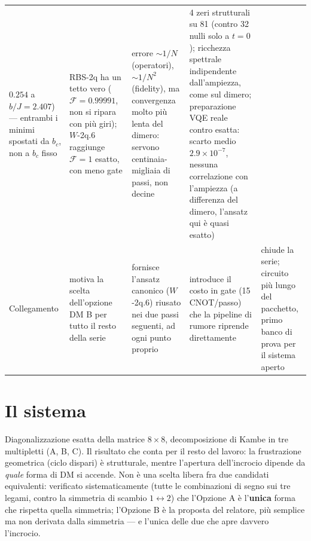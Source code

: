 \documentclass[11pt,a4paper]{article}
\begin{document}
\begin{landscape}
\begin{center}
\begin{tabular}{@{}>{\bfseries\raggedright}p{2.7cm} p{5.15cm} p{5.15cm} p{5.15cm} p{5.15cm}@{}}
$0.254$ a $b/J{=}2.407$) --- entrambi i minimi spostati da $b_c$, non a
$b_c$ fisso &
RBS-2q ha un tetto vero ($\mathcal F=0.99991$, non si ripara con più giri);
$W$-2q.6 raggiunge $\mathcal F=1$ esatto, con meno gate &
errore $\sim1/N$ (operatori), $\sim1/N^2$ (fidelity), ma convergenza molto
più lenta del dimero: servono centinaia-migliaia di passi, non decine &
4 zeri strutturali su 81 (contro 32 nulli solo a $t{=}0$); ricchezza
spettrale indipendente dall'ampiezza, come sul dimero; preparazione VQE
reale contro esatta: scarto medio $2.9\times10^{-7}$, nessuna correlazione
con l'ampiezza (a differenza del dimero, l'ansatz qui è quasi esatto) \\
\addlinespace
Collegamento &
motiva la scelta dell'opzione DM B per tutto il resto della serie &
fornisce l'ansatz canonico ($W$-2q.6) riusato nei due passi seguenti, ad
ogni punto proprio &
introduce il costo in gate (15 CNOT/passo) che la pipeline di rumore
riprende direttamente &
chiude la serie; circuito più lungo del pacchetto, primo banco di prova
per il sistema aperto \\
\bottomrule
\end{tabular}

\bigskip
{}
\end{center}
\end{landscape}

\clearpage

\section{Il sistema}

Diagonalizzazione esatta della matrice $8\times8$, decomposizione di Kambe
in tre multipletti (A, B, C). Il risultato che conta per il resto del
lavoro: la frustrazione geometrica (ciclo dispari) è strutturale, mentre
l'apertura dell'incrocio dipende da \emph{quale} forma di DM si accende.
Non è una scelta libera fra due candidati equivalenti: verificato
sistematicamente (tutte le combinazioni di segno sui tre legami, contro la
simmetria di scambio $1\leftrightarrow2$) che l'Opzione A è l'\textbf{unica}
forma che rispetta quella simmetria; l'Opzione B è la proposta del
relatore, più semplice ma non derivata dalla simmetria --- e l'unica delle
due che apre davvero l'incrocio.
\end{document}
